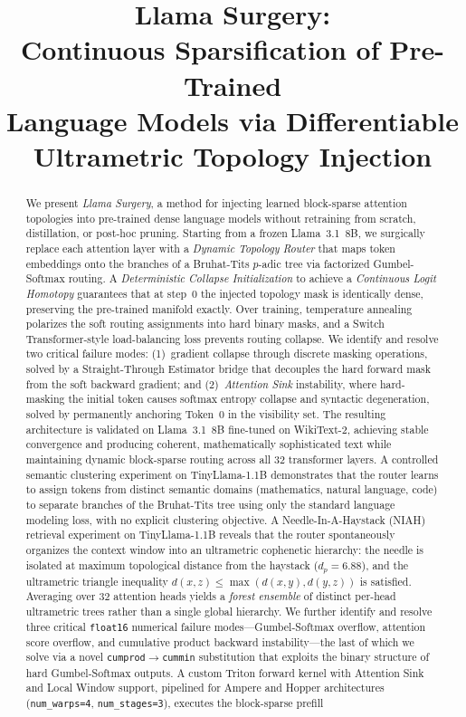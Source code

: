 \documentclass[11pt,a4paper]{article}
\title{\textbf{Llama Surgery:}\\
Continuous Sparsification of Pre-Trained\\
Language Models via Differentiable\\
Ultrametric Topology Injection}
\author{
}
\date{}
\begin{document}
\maketitle

\begin{abstract}
We present \emph{Llama Surgery}, a method for injecting learned block-sparse attention topologies into pre-trained dense language models without retraining from scratch, distillation, or post-hoc pruning. Starting from a frozen Llama~3.1~8B, we surgically replace each attention layer with a \emph{Dynamic Topology Router} that maps token embeddings onto the branches of a Bruhat-Tits $p$-adic tree via factorized Gumbel-Softmax routing. A \emph{Deterministic Collapse Initialization} to achieve a \emph{Continuous Logit Homotopy} guarantees that at step~0 the injected topology mask is identically dense, preserving the pre-trained manifold exactly. Over training, temperature annealing polarizes the soft routing assignments into hard binary masks, and a Switch Transformer-style load-balancing loss prevents routing collapse. We identify and resolve two critical failure modes: (1)~gradient collapse through discrete masking operations, solved by a Straight-Through Estimator bridge that decouples the hard forward mask from the soft backward gradient; and (2)~\emph{Attention Sink} instability, where hard-masking the initial token causes softmax entropy collapse and syntactic degeneration, solved by permanently anchoring Token~0 in the visibility set. The resulting architecture is validated on Llama~3.1~8B fine-tuned on WikiText-2, achieving stable convergence and producing coherent, mathematically sophisticated text while maintaining dynamic block-sparse routing across all 32 transformer layers. A controlled semantic clustering experiment on TinyLlama-1.1B demonstrates that the router learns to assign tokens from distinct semantic domains (mathematics, natural language, code) to separate branches of the Bruhat-Tits tree using only the standard language modeling loss, with no explicit clustering objective. A Needle-In-A-Haystack (NIAH) retrieval experiment on TinyLlama-1.1B reveals that the router spontaneously organizes the context window into an ultrametric cophenetic hierarchy: the needle is isolated at maximum topological distance from the haystack ($d_p = 6.88$), and the ultrametric triangle inequality $d(x,z) \leq \max(d(x,y), d(y,z))$ is satisfied. Averaging over 32 attention heads yields a \emph{forest ensemble} of distinct per-head ultrametric trees rather than a single global hierarchy. We further identify and resolve three critical \texttt{float16} numerical failure modes---Gumbel-Softmax overflow, attention score overflow, and cumulative product backward instability---the last of which we solve via a novel \texttt{cumprod}$\to$\texttt{cummin} substitution that exploits the binary structure of hard Gumbel-Softmax outputs. A custom Triton forward kernel with Attention Sink and Local Window support, pipelined for Ampere and Hopper architectures (\texttt{num\_warps=4}, \texttt{num\_stages=3}), executes the block-sparse prefill 
\end{abstract}
\end{document}
